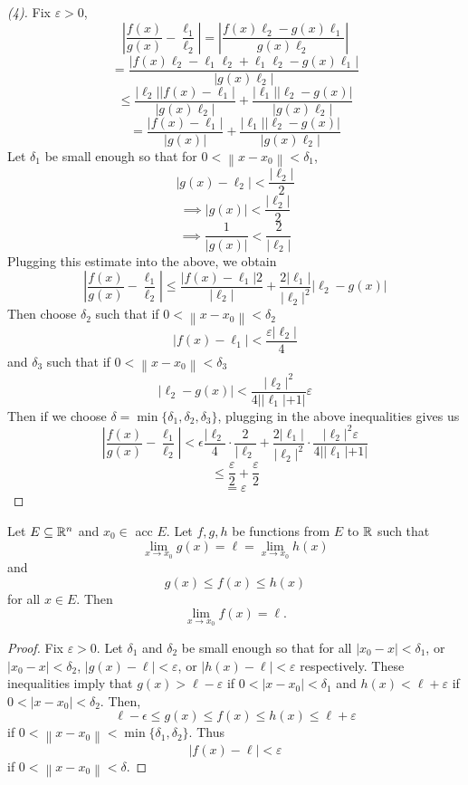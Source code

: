 \documentclass[11pt]{article}
\newcommand{\norm}[1]{\left\lVert #1 \right\rVert}
\newcommand{\ra}{\rightarrow}
\newcommand{\sse}{\subseteq}
\newcommand{\e}{\varepsilon}
\begin{document}
\begin{proof}[(4)]
    Fix $\e > 0$,
    \[\left| \frac{f(x)}{g(x)} - \frac{\ell_1}{\ell_2} \right| = \left| \frac{f(x)\ell_2 - g(x)\ell_1}{g(x)\ell_2} \right|\]
    \[ = \frac{|f(x)\ell_2 - \ell_1\ell_2 + \ell_1\ell_2 - g(x)\ell_1|}{|g(x)\ell_2|}\]
    \[\leq \frac{|\ell_2||f(x) - \ell_1|}{|g(x)\ell_2|} + \frac{|\ell_1||\ell_2 - g(x)|}{|g(x)\ell_2|}\]
    \[= \frac{|f(x) - \ell_1|}{|g(x)|} + \frac{|\ell_1||\ell_2 - g(x)|}{|g(x)\ell_2|}\]
    Let $\delta_1$ be small enough so that for $0 < \norm{x - x_0} < \delta_1$, 
    \[|g(x) - \ell_2| < \frac{|\ell_2|}{2}\]
    \[\implies |g(x)| < \frac{|\ell_2|}{2}\]
    \[\implies \frac{1}{|g(x)|} < \frac{2}{|\ell_2|}\]
    Plugging this estimate into the above, we obtain
    \[\left| \frac{f(x)}{g(x)} - \frac{\ell_1}{\ell_2} \right| \leq \frac{|f(x) - \ell_1|2}{|\ell_2|} + \frac{2|\ell_1|}{|\ell_2|^2}|\ell_2 - g(x)|\]
    Then choose $\delta_2$ such that if $0 < \norm{x - x_0} < \delta_2$
    \[|f(x) - \ell_1| < \frac{\varepsilon |\ell_2|}{4}\]
    and $\delta_3$ such that if $0 < \norm{x-x_0} < \delta_3$ 
    \[|\ell_2 - g(x) | < \frac{|\ell_2|^2}{4||\ell_1| + 1|}\varepsilon\]
    Then if we choose $\delta = \min\{\delta_1, \delta_2, \delta_3\}$, plugging in the above inequalities gives us 
    \[\left| \frac{f(x)}{g(x)} - \frac{\ell_1}{\ell_2} \right| < \epsilon \frac{|\ell_2}{4} \cdot \frac{2}{|\ell_2} + \frac{2|\ell_1|}{|\ell_2|^2}\cdot\frac{|\ell_2|^2 \varepsilon}{4||\ell_1| + 1|}\]
    \[\leq \frac{\varepsilon}{2} + \frac{\varepsilon}{2}\]
    \[= \varepsilon\]
\end{proof}

\begin{theorem}
    Let $E \sse \R^n$ and $x_0 \in $ acc $E$. Let $f, g, h$ be functions from $E$ to $\mathbb{R}$ such that 
    \[\lim_{x \ra x_0} g(x) = \ell = \lim_{x \ra x_0}h(x)\]
    and 
    \[g(x) \leq f(x) \leq h(x)\]
    for all $x \in E$. Then
    \[\lim_{x \ra x_0}f(x) = \ell.\]
\end{theorem}

\begin{proof}
    Fix $\varepsilon > 0$. Let $\delta_1$ and $\delta_2$ be small enough so that for all $|x_0-x| < \delta_1$, or $|x_0 - x | < \delta_2$, 
    $|g(x) - \ell| < \varepsilon$, or $|h(x)-\ell| < \varepsilon$ respectively.
    These inequalities imply that $g(x) > \ell - \varepsilon$ if $0 < |x - x_0 | < \delta_1$ and $h(x) < \ell+\varepsilon$ if $0 < |x - x_0 | < \delta_2$. Then,
    \[\ell - \epsilon \leq g(x) \leq f(x) \leq h(x) \leq \ell + \varepsilon\]
    if $0 < \norm{x - x_0} < \min\{\delta_1, \delta_2\}$. Thus \[|f(x) - \ell| < \varepsilon\]
    if $0 < \norm{x - x_0} < \delta$. 
\end{proof}
\end{document}
